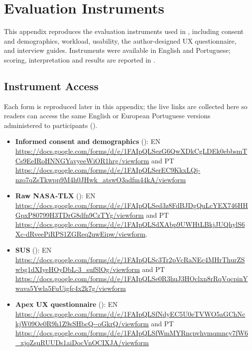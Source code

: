 
\chapter{Evaluation Instruments}
\label{chapter:appendixB}

This appendix reproduces the evaluation instruments used in , including consent and demographics, workload, usability, the author-designed \ac{UX} questionnaire, and interview guides. Instruments were available in English and Portuguese; scoring, interpretation and results are reported in .


\section{Instrument Access}
\label{sec:appB_access}

Each form is reproduced later in this appendix; the live links are collected here so readers can access the same English or European Portuguese versions administered to participants ().

\begin{itemize}[leftmargin=0.6cm, itemsep=0.3em]

\item \textbf{Informed consent and demographics} (): EN \url{https://docs.google.com/forms/d/e/1FAIpQLSezG6QwXDkCgLDEk0ebbsmTCs9EeIRoHNNGYavyeeWiOR1hrg/viewform} and PT \url{https://docs.google.com/forms/d/e/1FAIpQLSerEC9KkxLQj-nzo7qZsTkwpp9M4h0JHwk_atswO3adfm44kA/viewform}

\item \textbf{Raw \ac{NASA-TLX}} (): EN \url{https://docs.google.com/forms/d/e/1FAIpQLSed3z8FdBJDgQuLcYEX746HHGpxP80799H3TDrG8dfn9CzTYg/viewform} and PT \url{https://docs.google.com/forms/d/e/1FAIpQLSdXAbp9UWHtLBkjJUQhylS6Xc-dRveePiRPS1ZGReq2uwEipw/viewform}. 

\item \textbf{\ac{SUS}} (): EN \url{https://docs.google.com/forms/d/e/1FAIpQLSc3Tr2pVcRaNEc4MHrThurZSwbg1dXIyeHOyDbL-3_sufSlOg/viewform} and PT \url{https://docs.google.com/forms/d/e/1FAIpQLSe0R3huJ3HOclxn8rRqVqcpinYwava5Ywla5FuUigfc4x2k7g/viewform}

\item \textbf{Apex \ac{UX} questionnaire} (): EN \url{https://docs.google.com/forms/d/e/1FAIpQLSfNdyEC5U0eTVWO5aGChNckjW09Oe0R9h1Z9sSHbcQ--oGkrQ/viewform} and PT \url{https://docs.google.com/forms/d/e/1FAIpQLSfWmMYRncpvhvmqmncy7fW6_xjqZsuRUUDs1aiDocVnOCIXJA/viewform}

\end{itemize}


